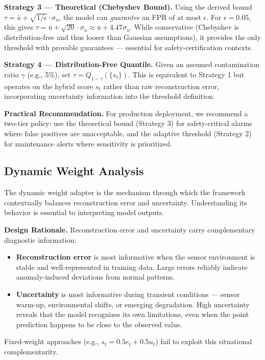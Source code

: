 \textbf{Strategy 3 — Theoretical (Chebyshev Bound).} Using the derived bound $\tau = \bar{u} + \sqrt{1/\epsilon} \cdot \sigma_u$, the model can \emph{guarantee} an FPR of at most $\epsilon$. For $\epsilon = 0.05$, this gives $\tau = \bar{u} + \sqrt{20} \cdot \sigma_u \approx \bar{u} + 4.47\sigma_u$. While conservative (Chebyshev is distribution-free and thus looser than Gaussian assumptions), it provides the only threshold with provable guarantees — essential for safety-certification contexts.

\textbf{Strategy 4 — Distribution-Free Quantile.} Given an assumed contamination ratio $\gamma$ (e.g., 5\%), set $\tau = Q_{1-\gamma}(\{s_t\})$. This is equivalent to Strategy 1 but operates on the hybrid score $s_t$ rather than raw reconstruction error, incorporating uncertainty information into the threshold definition.

\textbf{Practical Recommendation.} For production deployment, we recommend a two-tier policy: use the theoretical bound (Strategy 3) for safety-critical alarms where false positives are unacceptable, and the adaptive threshold (Strategy 2) for maintenance alerts where sensitivity is prioritized.

\subsection{Dynamic Weight Analysis}

The dynamic weight adapter is the mechanism through which the framework contextually balances reconstruction error and uncertainty. Understanding its behavior is essential to interpreting model outputs.

\textbf{Design Rationale.} Reconstruction error and uncertainty carry complementary diagnostic information:
\begin{itemize}
    \item \textbf{Reconstruction error} is most informative when the sensor environment is stable and well-represented in training data. Large errors reliably indicate anomaly-induced deviations from normal patterns.
    \item \textbf{Uncertainty} is most informative during transient conditions — sensor warm-up, environmental shifts, or emerging degradation. High uncertainty reveals that the model recognizes its own limitations, even when the point prediction happens to be close to the observed value.
\end{itemize}
Fixed-weight approaches (e.g., $s_t = 0.5e_t + 0.5u_t$) fail to exploit this situational complementarity.

